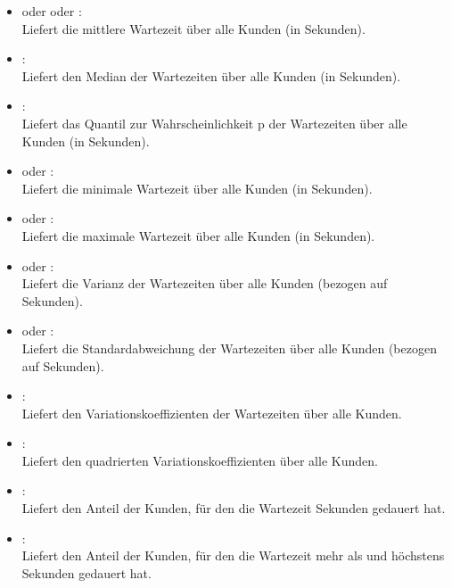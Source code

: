 \begin{itemize}

\item
{} oder  oder :\\
Liefert die mittlere Wartezeit über alle Kunden (in Sekunden).

\item
{}:\\
Liefert den Median der Wartezeiten über alle Kunden (in Sekunden).

\item
{}:\\
Liefert das Quantil zur Wahrscheinlichkeit p der Wartezeiten über alle Kunden (in Sekunden).

\item
{} oder :\\
Liefert die minimale Wartezeit über alle Kunden (in Sekunden).

\item
{} oder :\\
Liefert die maximale Wartezeit über alle Kunden (in Sekunden).

\item
{} oder :\\
Liefert die Varianz der Wartezeiten über alle Kunden (bezogen auf Sekunden).

\item
{} oder :\\
Liefert die Standardabweichung der Wartezeiten über alle Kunden (bezogen auf Sekunden).

\item
{}:\\
Liefert den Variationskoeffizienten der Wartezeiten über alle Kunden.

\item
{}:\\
Liefert den quadrierten Variationskoeffizienten über alle Kunden.

\item
{}:\\
Liefert den Anteil der Kunden, für den die Wartezeit  Sekunden gedauert hat.

\item
{}:\\
Liefert den Anteil der Kunden, für den die Wartezeit mehr als  und höchstens  Sekunden gedauert hat.

\end{itemize}  



